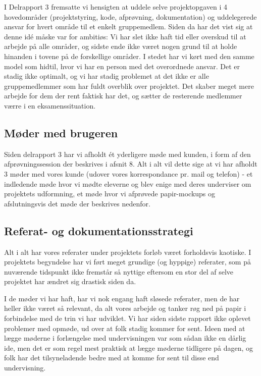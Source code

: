 \documentclass[10pt,a4paper,danish]{article}
\begin{document}
I Delrapport 3 fremsatte vi hensigten at uddele selve projektopgaven i 4 hovedområder
(projektstyring, kode, afprøvning, dokumentation) og uddelegerede ansvar for hvert 
område til et enkelt gruppemedlem. Siden da har det vist sig at denne idé måske var
for ambitiøs: Vi har slet ikke haft tid eller overskud til at arbejde på alle områder, 
og sidste ende ikke været nogen grund til at holde hinanden i tovene på de forskellige
områder. I stedet har vi kørt med den samme model som hidtil, hvor vi har en person med 
det overordnede ansvar. Det er stadig ikke optimalt, og vi har stadig problemet at det 
ikke er alle gruppemedlemmer som har fuldt overblik over projektet.
Det skaber meget mere arbejde for dem der rent faktisk har det,
og sætter de resterende medlemmer værre i en eksamenssituation.

\subsection{Møder med brugeren}
Siden delrapport 3 har vi afholdt ét yderligere møde med kunden, i form af 
den afprøvningssession der beskrives i afsnit 8. Alt i alt vil dette sige 
at vi har afholdt 3 møder med vores kunde (udover vores korrespondance pr. 
mail og telefon) - et indledende møde hvor vi mødte eleverne og blev enige
med deres underviser om projektets udformning, et møde hvor vi afprøvede 
papir-mockups og afslutningsvis det møde der beskrives nedenfor. 

\subsection{Referat- og dokumentationsstrategi}
Alt i alt har vores referater under projektets forløb været forholdsvis 
kaotiske. I projektets begyndelse har vi ført meget grundige (og hyppige)
referater, som på nuværende tidspunkt ikke fremstår så nyttige eftersom 
en stor del af selve projektet har ændret sig drastisk siden da. 

I de møder vi har haft, har vi nok engang haft sløsede referater, men de har
heller ikke været så relevant, da alt vores arbejde og tanker røg ned på papir
i forbindelse med de trin vi har udviklet. Vi har
siden sidste rapport ikke oplevet problemer med opmøde, ud over at folk stadig
kommer for sent. Ideen med at lægge møderne i forlængelse med undervisningen
var som sådan ikke en dårlig ide, men det er som regel mest praktisk at lægge
møderne tidligere på dagen, og folk har det tilsyneladende bedre med at komme
for sent til disse end undervisning. 
\end{document}
